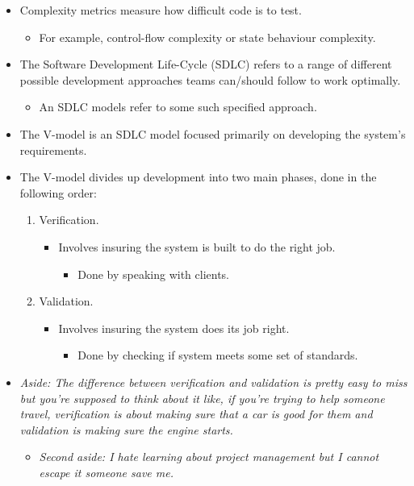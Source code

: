 \documentclass{article}
\newcounter{example}
\begin{document}
\begin{itemize}
	\item Complexity metrics measure how difficult code is to test.
	\begin{itemize}
		\item For example, control-flow complexity or state behaviour complexity.
	\end{itemize}
	\item The Software Development Life-Cycle (SDLC) refers to a range of different possible development approaches teams can/should follow to work optimally.
	\begin{itemize}
		\item An SDLC models refer to some such specified approach.
	\end{itemize}
	\item The V-model is an SDLC model focused primarily on developing the system's requirements.
	\item The V-model divides up development into two main phases, done in the following order:
	\begin{enumerate}
		\item Verification.
		\begin{itemize}
			\item Involves insuring the system is built to do the right job.
			\begin{itemize}
				\item Done by speaking with clients.
			\end{itemize}
		\end{itemize}
		\item Validation.
		\begin{itemize}
			\item Involves insuring the system does its job right.
			\begin{itemize}
				\item Done by checking if system meets some set of standards. \\
			\end{itemize}
		\end{itemize}
	\end{enumerate}

	\item \emph{Aside: The difference between verification and validation is pretty easy to miss but you're supposed to think about it like, if you're trying to help someone travel, verification is about making sure that a car is good for them and validation is making sure the engine starts.}
	\begin{itemize}
		\item \emph{Second aside: I hate learning about project management but I cannot escape it someone save me.}
	\end{itemize}
\end{itemize}

\ifdefined\iscombined
	\newpage
\else
	
\end{document}
